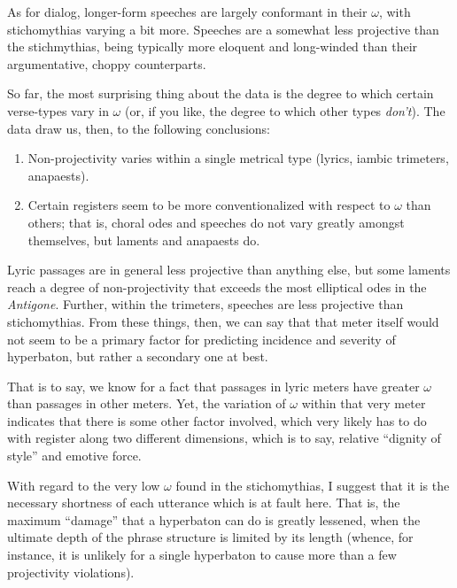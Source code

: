 \documentclass{article}
\newcommand{\FN}{\mathsf}
\begin{document}
As for dialog, longer-form speeches are largely conformant in their \ensuremath{\FN{\omega}},
with stichomythias varying a bit more. Speeches are a somewhat less projective
than the stichmythias, being typically more eloquent and long-winded than their
argumentative, choppy counterparts.

So far, the most surprising thing about the data is the degree to which certain
verse-types vary in \ensuremath{\FN{\omega}} (or, if you like, the degree to which other types
\emph{don't}). The data draw us, then, to the following conclusions:

\begin{enumerate}
\item Non-projectivity varies within a single metrical type (lyrics, iambic trimeters,
anapaests).

\item Certain registers seem to be more conventionalized with respect to \ensuremath{\FN{\omega}}
than others; that is, choral odes and speeches do not vary greatly amongst
themselves, but laments and anapaests do.
\end{enumerate}

\noindent
%
Lyric passages are in general less projective than anything else, but some
laments reach a degree of non-projectivity that exceeds the most elliptical odes
in the \emph{Antigone}. Further, within the trimeters, speeches are less projective
than stichomythias. From these things, then, we can say that that meter itself
would not seem to be a primary factor for predicting incidence and severity of
hyperbaton, but rather a secondary one at best.

That is to say, we know for a fact that passages in lyric meters have greater
\ensuremath{\FN{\omega}} than passages in other meters. Yet, the variation of \ensuremath{\FN{\omega}} within that
very meter indicates that there is some other factor involved, which very likely
has to do with register along two different dimensions, which is to say,
relative ``dignity of style'' and emotive force.

With regard to the very low \ensuremath{\FN{\omega}} found in the stichomythias, I suggest that
it is the necessary shortness of each utterance which is at fault here. That is,
the maximum ``damage'' that a hyperbaton can do is greatly lessened, when the
ultimate depth of the phrase structure is limited by its length (whence, for
instance, it is unlikely for a single hyperbaton to cause more than a few
projectivity violations).
\end{document}
